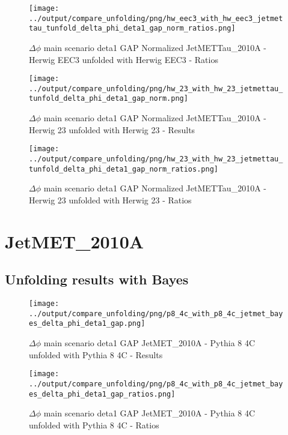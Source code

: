 \documentclass[11pt]{book}
\begin{document}
\begin{figure}[ht]
\centering
\texttt{[image: ../output/compare\_unfolding/png/hw\_eec3\_with\_hw\_eec3\_jetmettau\_tunfold\_delta\_phi\_deta1\_gap\_norm\_ratios.png]}
\caption{$\Delta\phi$ main scenario deta1 GAP Normalized JetMETTau\_2010A - Herwig EEC3 unfolded with Herwig EEC3 - Ratios}
\label{hw_eec3_hw_eec3_jetmettau_tunfold_delta_phi_deta1_gap_norm_b}
\end{figure}

\begin{figure}[ht]
\centering
\texttt{[image: ../output/compare\_unfolding/png/hw\_23\_with\_hw\_23\_jetmettau\_tunfold\_delta\_phi\_deta1\_gap\_norm.png]}
\caption{$\Delta\phi$ main scenario deta1 GAP Normalized JetMETTau\_2010A - Herwig 23 unfolded with Herwig 23 - Results}
\label{hw_23_hw_23_jetmettau_tunfold_delta_phi_deta1_gap_norm_a}
\end{figure}

\begin{figure}[ht]
\centering
\texttt{[image: ../output/compare\_unfolding/png/hw\_23\_with\_hw\_23\_jetmettau\_tunfold\_delta\_phi\_deta1\_gap\_norm\_ratios.png]}
\caption{$\Delta\phi$ main scenario deta1 GAP Normalized JetMETTau\_2010A - Herwig 23 unfolded with Herwig 23 - Ratios}
\label{hw_23_hw_23_jetmettau_tunfold_delta_phi_deta1_gap_norm_b}
\end{figure}


\clearpage
\section{JetMET\_2010A}
\subsection{Unfolding results with Bayes}

\begin{figure}[ht]
\centering
\texttt{[image: ../output/compare\_unfolding/png/p8\_4c\_with\_p8\_4c\_jetmet\_bayes\_delta\_phi\_deta1\_gap.png]}
\caption{$\Delta\phi$ main scenario deta1 GAP JetMET\_2010A - Pythia 8 4C unfolded with Pythia 8 4C - Results}
\label{p8_p8_jetmet_bayes_delta_phi_deta1_gap_a}
\end{figure}

\begin{figure}[ht]
\centering
\texttt{[image: ../output/compare\_unfolding/png/p8\_4c\_with\_p8\_4c\_jetmet\_bayes\_delta\_phi\_deta1\_gap\_ratios.png]}
\caption{$\Delta\phi$ main scenario deta1 GAP JetMET\_2010A - Pythia 8 4C unfolded with Pythia 8 4C - Ratios}
\label{p8_p8_jetmet_bayes_delta_phi_deta1_gap_b}
\end{figure}
\end{document}
